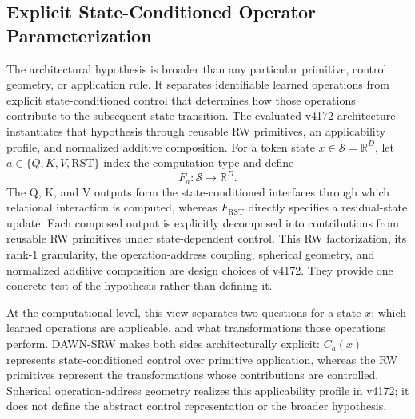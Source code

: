 \documentclass{article}
\newcommand{\R}{\mathbb{R}}
\newcommand{\DAWN}{DAWN-SRW}
\begin{document}
\subsection{Explicit State-Conditioned Operator Parameterization}
\label{sec:transition-hypothesis}

The architectural hypothesis is broader than any particular primitive, control
geometry, or application rule. It separates identifiable learned operations
from explicit state-conditioned control that determines how those operations
contribute to the subsequent state transition. The evaluated v4172
architecture instantiates that hypothesis through reusable RW primitives, an
applicability profile, and normalized additive composition. For a token state
\(x\in\mathcal{S}=\R^D\), let
\(a\in\{Q,K,V,\mathrm{RST}\}\) index the computation type and define
\begin{equation}
F_a:\mathcal{S}\rightarrow\R^D.
\label{eq:composed_output}
\end{equation}
The Q, K, and V outputs form the state-conditioned interfaces through which
relational interaction is computed, whereas \(F_{\mathrm{RST}}\) directly
specifies a residual-state update. Each composed output is explicitly
decomposed into contributions from reusable RW primitives under state-dependent
control. This RW factorization, its rank-1 granularity, the operation-address
coupling, spherical geometry, and normalized additive composition are design
choices of v4172. They provide one concrete test of the hypothesis rather than
defining it.

At the computational level, this view separates two questions for a state
\(x\): which learned operations are applicable, and what transformations those
operations perform. \DAWN{} makes both sides architecturally explicit:
\(C_a(x)\) represents state-conditioned control over primitive application,
whereas the RW primitives represent the transformations whose contributions are
controlled. Spherical operation-address geometry realizes this applicability
profile in v4172; it does not define the abstract control representation or the
broader hypothesis.
\end{document}
